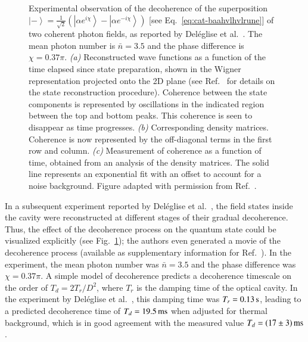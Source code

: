 \documentclass[3p,sort&compress]{elsarticle}
\newcommand{\ket}[1]{\left\vert{#1}\right\rangle}
\newcommand{\E}{\ensuremath{e}}
\newcommand{\I}{\ensuremath{i}}
\begin{document}
\begin{figure}
\caption{Experimental observation of the decoherence of the superposition $\ket{-} = \frac{1}{\sqrt{2}} \left( \ket{\alpha \E^{\I \chi}} - \ket{\alpha \E^{-\I \chi}} \right)$ [see Eq.~\eqref{eq:cat-baahvlhvlrune}] of two coherent photon fields, as reported by Del{\'e}glise et al.\ \cite{Deleglise:2008:oo}. The mean photon number is $\bar{n}=3.5$ and the phase difference is $\chi=0.37\pi$. \emph{(a)} Reconstructed wave functions as a function of the time elapsed since state preparation, shown in the Wigner representation projected onto the 2D plane \cite{Wigner:1932:un,Hillery:1984:tv} (see Ref.~\cite{Deleglise:2008:oo} for details on the state reconstruction procedure). Coherence between the state components is represented by oscillations in the indicated region between the top and bottom peaks. This coherence is seen to disappear as time progresses. \emph{(b)} Corresponding density matrices. Coherence is now represented by the off-diagonal terms in the first row and column. \emph{(c)} Measurement of coherence as a function of time, obtained from an analysis of the density matrices. The solid line represents an exponential fit with an offset to account for a noise background.  Figure adapted with permission from Ref.~\cite{Deleglise:2008:oo}.}
\label{fig:qeddecoh}
\end{figure}

In a subsequent experiment reported by Del{\'e}glise et al.\ \cite{Deleglise:2008:oo}, the field states inside the cavity were reconstructed at different stages of their gradual decoherence. Thus, the effect of the decoherence process on the quantum state could be visualized explicitly (see Fig.~\ref{fig:qeddecoh}); the authors even generated a movie of the decoherence process (available as supplementary information for Ref.~\cite{Deleglise:2008:oo}).  In the experiment, the mean photon number was $\bar{n}=3.5$ and the phase difference was $\chi=0.37\pi$. A simple model of decoherence \cite{Walls:1985:pp,Brune:1992:zz,Haroche:2006:hh} predicts a decoherence timescale on the order of $T_d=2T_r/D^2$, where $T_r$ is the damping time of the optical cavity. In the experiment by Del{\'e}glise et al.\ \cite{Deleglise:2008:oo}, this damping time was $T_r=\unit[0.13]{s}$, leading to a predicted decoherence time of $T_d=\unit[19.5]{ms}$ when adjusted for thermal background, which is in good agreement with the measured value $T_d=\unit[(17 \pm 3)]{ms}$. 
\end{document}
